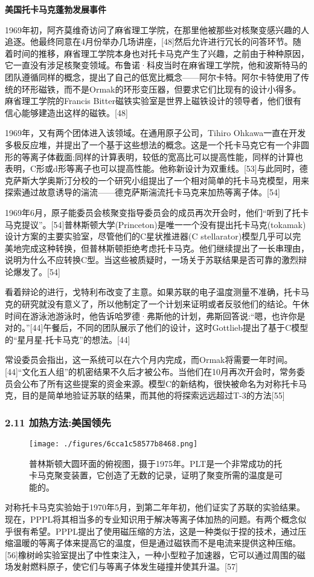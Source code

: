 \textbf{美国托卡马克蓬勃发展事件}

1969年初，阿齐莫维奇访问了麻省理工学院，在那里他被那些对核聚变感兴趣的人追逐。他最终同意在4月份举办几场讲座，[48]然后允许进行冗长的问答环节。随着时间的推移，麻省理工学院本身也对托卡马克产生了兴趣，之前由于种种原因，它一直没有涉足核聚变领域。布鲁诺·科皮当时在麻省理工学院，他和波斯特马的团队遵循同样的概念，提出了自己的低宽比概念——阿尔卡特。阿尔卡特使用了传统的环形磁铁，而不是Ormak的环形变压器，但要求它们比现有的设计小得多。麻省理工学院的Francis Bitter磁铁实验室是世界上磁铁设计的领导者，他们很有信心能够建造出这样的磁铁。[48]

1969年，又有两个团体进入该领域。在通用原子公司，Tihiro Ohkawa一直在开发多极反应堆，并提出了一个基于这些想法的概念。这是一个托卡马克它有一个非圆形的等离子体截面;同样的计算表明，较低的宽高比可以提高性能，同样的计算也表明，C形或d形等离子也可以提高性能。他称新设计为双重线。[53]与此同时，德克萨斯大学奥斯汀分校的一个研究小组提出了一个相对简单的托卡马克模型，用来探索通过故意诱导的湍流——德克萨斯湍流托卡马克来加热等离子体。[54]

1969年6月，原子能委员会核聚变指导委员会的成员再次开会时，他们“听到了托卡马克提议”。[54]普林斯顿大学(Princeton)是唯一一个没有提出托卡马克(tokamak)设计方案的主要实验室，尽管他们的C星状推进器(C stellarator)模型几乎可以完美地完成这种转换，但普林斯顿拒绝考虑托卡马克。他们继续提出了一长串理由，说明为什么不应转换C型。当这些被质疑时，一场关于苏联结果是否可靠的激烈辩论爆发了。[54]

看着辩论的进行，戈特利布改变了主意。如果苏联的电子温度测量不准确，托卡马克的研究就没有意义了，所以他制定了一个计划来证明或者反驳他们的结论。午休时间在游泳池游泳时，他告诉哈罗德·弗斯他的计划，弗斯回答说:“嗯，也许你是对的。”[44]午餐后，不同的团队展示了他们的设计，这时Gottlieb提出了基于C模型的“星月星-托卡马克”的想法。[44]

常设委员会指出，这一系统可以在六个月内完成，而Ormak将需要一年时间。[44]“文化五人组”的机密结果不久后才被公布。当他们在10月再次开会时，常务委员会公布了所有这些提案的资金来源。模型C的新结构，很快被命名为对称托卡马克，目的是简单地验证苏联的结果，而其他的将探索远远超过T-3的方法[55]
\subsubsection{2.11 加热方法:美国领先}
\begin{figure}[ht]
\centering
\texttt{[image: ./figures/6cca1c58577b8468.png]}
\caption{普林斯顿大圆环面的俯视图，摄于1975年。PLT是一个非常成功的托卡马克聚变装置，它创造了无数的记录，证明了聚变所需的温度是可能的。} \label{fig_TKMK_2}
\end{figure}
对称托卡马克实验始于1970年5月，到第二年年初，他们证实了苏联的实验结果。现在，PPPL将其相当多的专业知识用于解决等离子体加热的问题。有两个概念似乎很有希望。PPPL提出了使用磁压缩的方法，这是一种类似于捏的技术，通过压缩温暖的等离子体来提高它的温度，但是通过磁铁而不是电流来提供这种压缩。[56]橡树岭实验室提出了中性束注入，一种小型粒子加速器，它可以通过周围的磁场发射燃料原子，使它们与等离子体发生碰撞并使其升温。[57]

